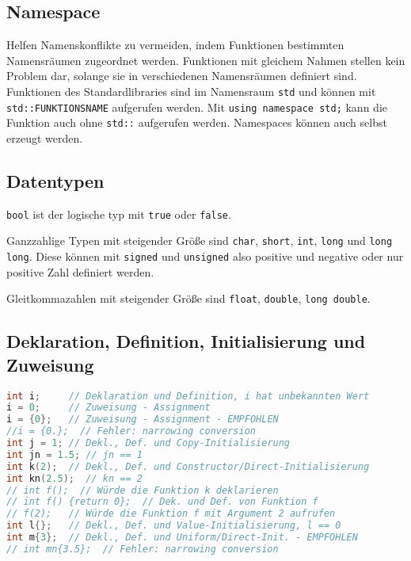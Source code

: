 \documentclass[10pt,twocolumn]{scrartcl}
\begin{document}
\subsection{Namespace}

Helfen Namenskonflikte zu vermeiden, indem Funktionen bestimmten Namensräumen
zugeordnet werden. Funktionen mit gleichem Nahmen stellen kein Problem dar,
solange sie in verschiedenen Namensräumen definiert sind. Funktionen des
Standardlibraries sind im Namensraum \lstinline|std| und können mit
\lstinline|std::FUNKTIONSNAME| aufgerufen werden. Mit
\lstinline|using namespace std;| kann die Funktion auch ohne \lstinline|std::|
aufgerufen werden. Namespaces können auch selbst erzeugt werden.

\subsection{Datentypen}

\lstinline|bool| ist der logische typ mit \lstinline|true| oder
\lstinline|false|.

Ganzzahlige Typen mit steigender Größe sind \lstinline|char|, \lstinline|short|,
\lstinline|int|, \lstinline|long| und \lstinline|long long|. Diese können mit
\lstinline|signed| und \lstinline|unsigned| also positive und negative oder nur
positive Zahl definiert werden.

Gleitkommazahlen mit steigender Größe sind \lstinline|float|,
\lstinline|double|, \lstinline|long double|.

\subsection{Deklaration, Definition, Initialisierung und Zuweisung}

\begin{lstlisting}[language=C++]
int i;     // Deklaration und Definition, i hat unbekannten Wert
i = 0;     // Zuweisung - Assignment
i = {0};   // Zuweisung - Assignment - EMPFOHLEN
//i = {0.};  // Fehler: narrowing conversion
int j = 1; // Dekl., Def. und Copy-Initialisierung
int jn = 1.5; // jn == 1
int k(2);  // Dekl., Def. und Constructor/Direct-Initialisierung
int kn(2.5);  // kn == 2
// int f();  // Würde die Funktion k deklarieren
// int f() {return 0};  // Dek. und Def. von Funktion f
// f(2);   // Würde die Funktion f mit Argument 2 aufrufen
int l{};   // Dekl., Def. und Value-Initialisierung, l == 0
int m{3};  // Dekl., Def. und Uniform/Direct-Init. - EMPFOHLEN
// int mn{3.5};  // Fehler: narrowing conversion
\end{lstlisting}
\end{document}
